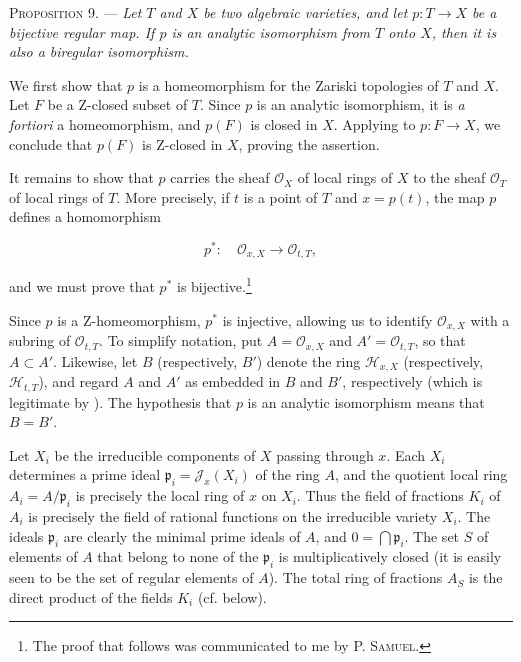 \textsc{Proposition 9}. --- \emph{Let $T$ and $X$ be two algebraic varieties, and let $p:T\to X$ be a bijective regular map. If $p$ is an analytic isomorphism from $T$ onto $X$, then it is also a biregular isomorphism.}

We first show that $p$ is a homeomorphism for the Zariski topologies of $T$ and $X$. Let $F$ be a Z-closed subset of $T$. Since $p$ is an analytic isomorphism, it is \emph{a fortiori} a homeomorphism, and $p(F)$ is closed in $X$. Applying  to $p:F\to X$, we conclude that $p(F)$ is Z-closed in $X$, proving the assertion.

It remains to show that $p$ carries the sheaf $\mathcal{O}_X$ of local rings of $X$ to the sheaf $\mathcal{O}_T$ of local rings of $T$. More precisely, if $t$ is a point of $T$ and $x=p(t)$, the map $p$ defines a homomorphism

\begin{equation*}
p^*:\quad\mathcal{O}_{x,X}\longrightarrow\mathcal{O}_{t,T},
\end{equation*}

and we must prove that $p^*$ is bijective.\footnote{The proof that follows was communicated to me by P. \textsc{Samuel}.}

Since $p$ is a Z-homeomorphism, $p^*$ is injective, allowing us to identify $\mathcal{O}_{x,X}$ with a subring of $\mathcal{O}_{t,T}$. To simplify notation, put $A=\mathcal{O}_{x,X}$ and $A'=\mathcal{O}_{t,T}$, so that $A\subset A'$. Likewise, let $B$ (respectively, $B'$) denote the ring $\mathcal{H}_{x,X}$ (respectively, $\mathcal{H}_{t,T}$), and regard $A$ and $A'$ as embedded in $B$ and $B'$, respectively (which is legitimate by ). The hypothesis that $p$ is an analytic isomorphism means that $B=B'$.

Let $X_i$ be the irreducible components of $X$ passing through $x$. Each $X_i$ determines a prime ideal $\mathfrak{p}_i=\mathcal{J}_x(X_i)$ of the ring $A$, and the quotient local ring $A_i=A/\mathfrak{p}_i$ is precisely the local ring of $x$ on $X_i$. Thus the field of fractions $K_i$ of $A_i$ is precisely the field of rational functions on the irreducible variety $X_i$. The ideals $\mathfrak{p}_i$ are clearly the minimal prime ideals of $A$, and $0=\bigcap\mathfrak{p}_i$. The set $S$ of elements of $A$ that belong to none of the $\mathfrak{p}_i$ is multiplicatively closed (it is easily seen to be the set of regular elements of $A$). The total ring of fractions $A_S$ is the direct product of the fields $K_i$ (cf.  below).

